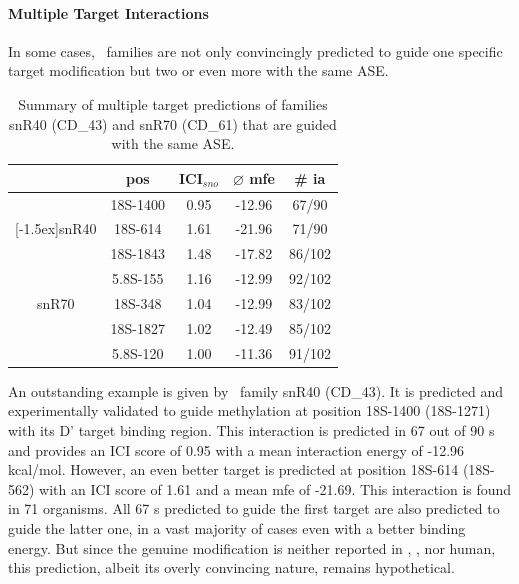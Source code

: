 \paragraph{\textbf{Multiple Target Interactions}}
In some cases, \sno\ families are not only convincingly predicted to
guide one specific target modification but two or even more with the
same ASE.
\begin{table}
  \caption{Summary of multiple target predictions of families 
    snR40 (CD\_43) and snR70 (CD\_61) that are guided with the same ASE.}
  \label{tab:redundant_predictions}
  \begin{center}
    \begin{footnotesize}
      \begin{tabular}{c|c|c|c|c}
        &pos&ICI$_{sno}$&$\varnothing$
          mfe&\# ia\\
        \hline
        &18S-1400&0.95&-12.96&67/90\\
        \raisebox{1.5ex}[-1.5ex]{snR40}&18S-614&1.61&-21.96&71/90\\
        \hline
        &18S-1843&1.48&-17.82&86/102\\
        &5.8S-155&1.16&-12.99&92/102\\
        snR70&18S-348&1.04&-12.99&83/102\\
        &18S-1827&1.02&-12.49&85/102\\
        &5.8S-120&1.00&-11.36&91/102\\
      \end{tabular}
    \end{footnotesize}
  \end{center}
\end{table}
An outstanding example is given by \cd\ family snR40 (CD\_43). It is
predicted and experimentally validated \cite{Lowe:1999} to guide
methylation at position 18S-1400 (18S-1271) with its D' target binding
region. This interaction is predicted in 67 out of 90 \sno s and
provides an ICI score of 0.95 with a mean interaction energy of -12.96
kcal/mol. However, an even better target is predicted at position
18S-614 (18S-562) with an ICI score of 1.61 and a mean mfe of
-21.69. This interaction is found in 71 organisms. All 67 \sno s
predicted to guide the first target are also predicted to guide the
latter one, in a vast majority of cases even with a better binding
energy. But since the genuine modification is neither reported in
\sce, \ncr, nor human, this prediction, albeit its overly convincing
nature, remains hypothetical.

